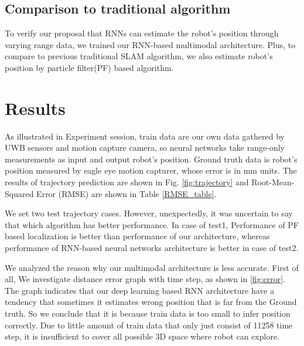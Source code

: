 \documentclass[letterpaper, 10 pt, conference]{ieeeconf}  %
\begin{document}
\subsection{Comparison to traditional algorithm}

To verify our proposal that RNNs can estimate the robot's position through varying range data, we trained our RNN-based multimodal architecture. Plus, to compare to previous traditional SLAM algorithm, we also estimate robot's position by particle filter(PF) based algorithm.

\section{Results}

 As illustrated in Experiment session, train data are our own data gathered by UWB sensors and motion capture camera, so neural networks take range-only measurements as input and output robot's position. Ground truth data is robot's position measured by eagle eye motion capturer, whose error is in mm units. The results of trajectory prediction are shown in Fig. \ref{fig:trajectory} and Root-Mean-Squared Error (RMSE) are shown in Table \ref{RMSE_table}.

 We set two test trajectory cases. However, unexpectedly, it was uncertain to say that which algorithm has better performance. In case of test1, Performance of PF based localization is better than performance of our architecture, whereas performance of RNN-based neural networks architecture is better in case of test2. 
 
 We analyzed the reason why our multimodal architecture is less accurate. First of all, We investigate distance error graph with time step, as shown in \ref{fig:error}. The graph indicates that our deep learning based RNN architecture have a tendency that sometimes it estimates wrong position that is far from the Ground truth. So we conclude that it is because train data is too small to infer position correctly. Due to little amount of train data that only just consist of 11258 time step, it is insufficient to cover all possible 3D space where robot can explore.
 
\end{document}
